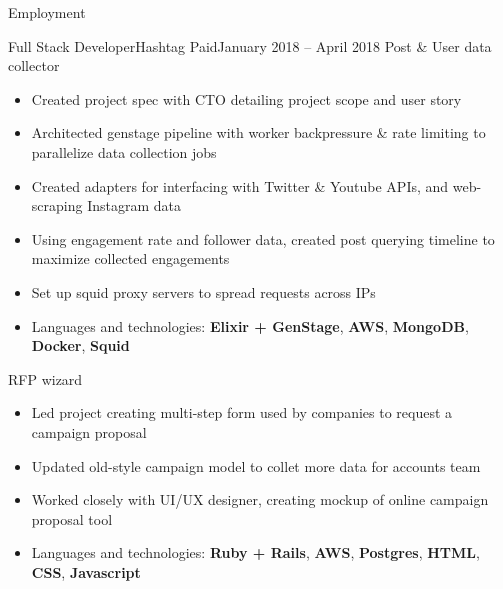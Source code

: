 \documentclass[calibri]{mcdowellcv}
\begin{document}
    \begin{cvsection}{\Large{Employment}}
        \begin{cvsubsection}{Full Stack Developer}{Hashtag Paid}{January 2018 -- April 2018}
            Post \& User data collector
            \begin{itemize}
                \item Created project spec with CTO detailing project scope and user story
                \item Architected genstage pipeline with worker backpressure \& rate limiting to parallelize data collection jobs
                \item Created adapters for interfacing with Twitter \& Youtube APIs, and web-scraping Instagram data
                \item Using engagement rate and follower data, created post querying timeline to maximize collected engagements
                \item Set up squid proxy servers to spread requests across IPs
                \item Languages and technologies: \textbf{Elixir + GenStage}, \textbf{AWS}, \textbf{MongoDB}, \textbf{Docker}, \textbf{Squid}
            \end{itemize}

            RFP wizard
            \begin{itemize}
                \item Led project creating multi-step form used by companies to request a campaign proposal
                \item Updated old-style campaign model to collet more data for accounts team
                \item Worked closely with UI/UX designer, creating mockup of online campaign proposal tool
                \item Languages and technologies: \textbf{Ruby + Rails}, \textbf{AWS}, \textbf{Postgres}, \textbf{HTML}, \textbf{CSS}, \textbf{Javascript}
            \end{itemize}
        \end{cvsubsection}
    \end{cvsection}
\end{document}
